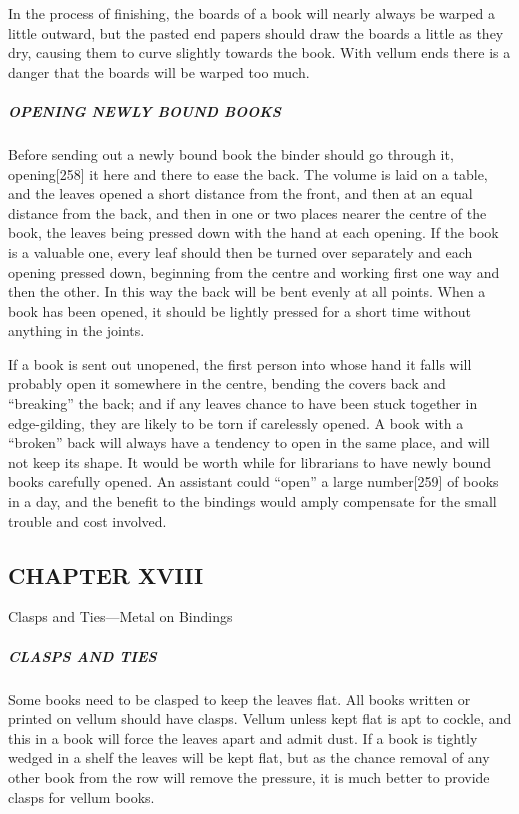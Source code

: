 \documentclass[
]{article}
\begin{document}
In the process of finishing, the boards of a book will nearly always be
warped a little outward, but the pasted end papers should draw the
boards a little as they dry, causing them to curve slightly towards the
book. With vellum ends there is a danger that the boards will be warped
too much.

\hypertarget{opening-newly-bound-books}{%
\subparagraph{OPENING NEWLY BOUND
BOOKS}\label{opening-newly-bound-books}}

Before sending out a newly bound book the binder should go through it,
opening{\protect\hypertarget{Page_258}{}{{[}258{]}}} it here and there
to ease the back. The volume is laid on a table, and the leaves opened a
short distance from the front, and then at an equal distance from the
back, and then in one or two places nearer the centre of the book, the
leaves being pressed down with the hand at each opening. If the book is
a valuable one, every leaf should then be turned over separately and
each opening pressed down, beginning from the centre and working first
one way and then the other. In this way the back will be bent evenly at
all points. When a book has been opened, it should be lightly pressed
for a short time without anything in the joints.

If a book is sent out unopened, the first person into whose hand it
falls will probably open it somewhere in the centre, bending the covers
back and ``breaking'' the back; and if any leaves chance to have been
stuck together in edge-gilding, they are likely to be torn if carelessly
opened. A book with a ``broken'' back will always have a tendency to
open in the same place, and will not keep its shape. It would be worth
while for librarians to have newly bound books carefully opened. An
assistant could ``open'' a large
number{\protect\hypertarget{Page_259}{}{{[}259{]}}} of books in a day,
and the benefit to the bindings would amply compensate for the small
trouble and cost involved.

\hypertarget{chapter-xviii}{%
\subsection[CHAPTER
XVIII]{\texorpdfstring{\protect\hypertarget{CHAPTER_XVIII}{}{}CHAPTER
XVIII}{CHAPTER XVIII}}\label{chapter-xviii}}

Clasps and Ties---Metal on Bindings

\hypertarget{clasps-and-ties}{%
\subparagraph{CLASPS AND TIES}\label{clasps-and-ties}}

{Some} books need to be clasped to keep the leaves flat. All books
written or printed on vellum should have clasps. Vellum unless kept flat
is apt to cockle, and this in a book will force the leaves apart and
admit dust. If a book is tightly wedged in a shelf the leaves will be
kept flat, but as the chance removal of any other book from the row will
remove the pressure, it is much better to provide clasps for vellum
books.
\end{document}
